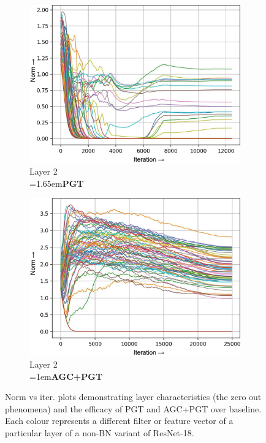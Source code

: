 \documentclass[runningheads]{llncs}
\newcommand{\forceindenta}{\parindent=1em\indent\parindent=0pt\relax}
\newcommand{\forceindentb}{\parindent=1.65em\indent\parindent=0pt\relax}
\begin{document}
\begin{figure}[t]
\begin{subfigure}[t]{0.16\textwidth}
\includegraphics[width=\textwidth]{trimmed/pgt-w-layer-1-2}
\caption{Layer 2\\ \forceindentb\textbf{PGT}}
\end{subfigure}
\begin{subfigure}[t]{0.16\textwidth}
\includegraphics[width=\textwidth]{trimmed/agc_pgt-w-layer-1-2}
\caption{Layer 2\\ \forceindenta\textbf{AGC+PGT}}
\end{subfigure}
\captionsetup{font=normalsize}
\caption{ Norm vs iter. plots demonstrating layer characteristics (the zero out
phenomena) and the efficacy of PGT and AGC+PGT over baseline. Each colour represents a
different filter or feature vector of a particular layer of a non-BN variant of
ResNet-18. }
\label{fig:norm_plots}
\vspace{-0.5cm}
\end{figure}
\end{document}
